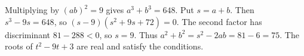 Multiplying by $(ab)^2=9$ gives $a^3+b^3=648$. Put $s=a+b$. Then $s^3-9s=648$, so $(s-9)(s^2+9s+72)=0$. The second factor has discriminant $81-288<0$, so $s=9$. Thus $a^2+b^2=s^2-2ab=81-6=\boxed{75}$. The roots of $t^2-9t+3$ are real and satisfy the conditions.
